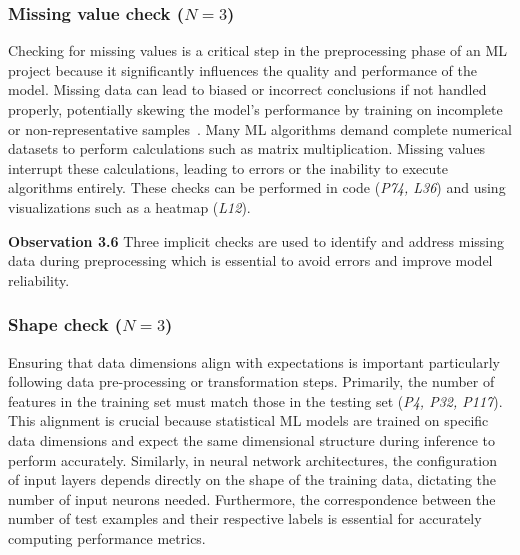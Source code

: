 \documentclass[smallextended]{svjour3}       %
\newcommand{\highlight}[1]{\begin{framed}%
  \noindent#1
\end{framed}}
\providecommand{\DIFaddbegin}{} %
\providecommand{\DIFaddend}{} %
\providecommand{\DIFdelbegin}{} %
\providecommand{\DIFdelend}{} %
\newcommand{\DIFscaledelfig}{0.5}
\newlength{\DIFdelgraphicswidth} %
\newlength{\DIFdelgraphicsheight} %
\newcommand{\DIFaddincludegraphics}[2][]{{\color{blue}\fbox{\DIFOincludegraphics[#1]{#2}}}} %
\newcommand{\DIFdelincludegraphics}[2][]{%
\sbox{\DIFdelgraphicsbox}{\DIFOincludegraphics[#1]{#2}}%
\settoboxwidth{\DIFdelgraphicswidth}{\DIFdelgraphicsbox} %
\settoboxtotalheight{\DIFdelgraphicsheight}{\DIFdelgraphicsbox} %
\scalebox{\DIFscaledelfig}{%
\parbox[b]{\DIFdelgraphicswidth}{\usebox{\DIFdelgraphicsbox}\\[-\baselineskip] \rule{\DIFdelgraphicswidth}{0em}}\llap{\resizebox{\DIFdelgraphicswidth}{\DIFdelgraphicsheight}{%
\setlength{\unitlength}{\DIFdelgraphicswidth}%
\begin{picture}(1,1)%
\thicklines\linethickness{2pt} %
{\color[rgb]{1,0,0}\put(0,0){\framebox(1,1){}}}%
{\color[rgb]{1,0,0}\put(0,0){\line( 1,1){1}}}%
{\color[rgb]{1,0,0}\put(0,1){\line(1,-1){1}}}%
\end{picture}%
}\hspace*{3pt}}} %
} %
\DeclareRobustCommand{\DIFaddbegin}{\DIFOaddbegin \let\includegraphics\DIFaddincludegraphics} %
\DeclareRobustCommand{\DIFaddend}{\DIFOaddend \let\includegraphics\DIFOincludegraphics} %
\DeclareRobustCommand{\DIFdelbegin}{\DIFOdelbegin \let\includegraphics\DIFdelincludegraphics} %
\DeclareRobustCommand{\DIFdelend}{\DIFOaddend \let\includegraphics\DIFOincludegraphics} %
\begin{document}
\subsubsection{Missing value check ($N = 3$)}

Checking for missing values is a critical step in the preprocessing phase of an ML project because it significantly influences the quality and performance of the model. Missing data can lead to biased or incorrect conclusions if not handled properly, potentially skewing the model's performance by training on incomplete or non-representative samples~\citep{shome2022data}. Many ML algorithms demand complete numerical datasets to perform calculations such as matrix multiplication. Missing values interrupt these calculations, leading to errors or the inability to execute algorithms entirely. These checks can be performed in code (\emph{P74, L36}) and using visualizations such as a heatmap (\emph{L12}).

\DIFdelbegin %
\DIFdelend \DIFaddbegin \highlight{\textbf{Observation 3.6} Three implicit checks are used to identify and address missing data during preprocessing which is essential to avoid errors and improve model reliability.}
\DIFaddend 

\subsubsection{Shape check ($N = 3$)}

Ensuring that data dimensions align with expectations is important particularly following data pre-processing or transformation steps. Primarily, the number of features in the training set must match those in the testing set (\emph{P4, P32, P117}). This alignment is crucial because statistical ML models are trained on specific data dimensions and expect the same dimensional structure during inference to perform accurately. Similarly, in neural network architectures, the configuration of input layers depends directly on the shape of the training data, dictating the number of input neurons needed. Furthermore, the correspondence between the number of test examples and their respective labels is essential for accurately computing performance metrics.
\end{document}
